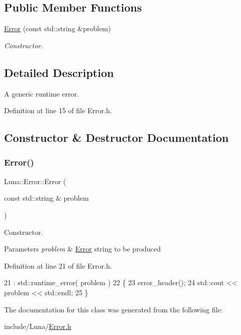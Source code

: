 \subsection*{Public Member Functions}
\begin{DoxyCompactItemize}
\item 
\hyperlink{classLuna_1_1Error_ab6532a3edbc267560cf74e02007e19b8}{Error} (const std\+::string \&problem)
\begin{DoxyCompactList}\small\item\em Constructor. \end{DoxyCompactList}\end{DoxyCompactItemize}


\subsection{Detailed Description}
A generic runtime error. 

Definition at line 15 of file Error.\+h.



\subsection{Constructor \& Destructor Documentation}
\mbox{\label{classLuna_1_1Error_ab6532a3edbc267560cf74e02007e19b8}} 
\subsubsection{\texorpdfstring{Error()}{Error()}}
{\footnotesize\ttfamily Luna\+::\+Error\+::\+Error (\begin{DoxyParamCaption}\item[{const std\+::string \&}]{problem }\end{DoxyParamCaption})\hspace{0.3cm}{\ttfamily [inline]}}



Constructor. 


\begin{DoxyParams}{Parameters}
{\em problem} & \hyperlink{classLuna_1_1Error}{Error} string to be produced \\
\hline
\end{DoxyParams}


Definition at line 21 of file Error.\+h.


\begin{DoxyCode}
21                                       : std::runtime\_error( problem )
22     \{
23       error\_header();
24       std::cout << problem << std::endl;
25     \}
\end{DoxyCode}


The documentation for this class was generated from the following file\+:\begin{DoxyCompactItemize}
\item 
include/\+Luna/\hyperlink{Error_8h}{Error.\+h}\end{DoxyCompactItemize}
